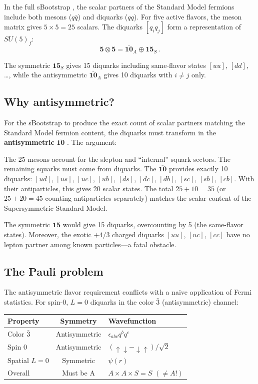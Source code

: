 \documentclass[12pt,a4paper]{article}
\begin{document}
In the full sBootstrap \cite{Rivero2005}, the scalar partners of 
the Standard Model fermions include both mesons ($q\bar{q}$) and 
diquarks ($qq$). For five active flavors, the meson matrix gives 
$5 \times 5 = 25$ scalars. The diquarks $[q_i q_j]$ form a 
representation of $SU(5)_f$:
\begin{equation}
\mathbf{5} \otimes \mathbf{5} = \overline{\mathbf{10}}_A 
\oplus \mathbf{15}_S\,.
\end{equation}

The symmetric $\mathbf{15}_S$ gives 15 diquarks including 
same-flavor states $[uu]$, $[dd]$, \ldots, while the antisymmetric 
$\overline{\mathbf{10}}_A$ gives 10 diquarks with $i \neq j$ only.

\subsection{Why antisymmetric?}

For the sBootstrap to produce the exact count of scalar partners 
matching the Standard Model fermion content, the diquarks must 
transform in the \textbf{antisymmetric} $\overline{\mathbf{10}}$ 
\cite{Rivero2005}. The argument:

The 25 mesons account for the slepton and ``internal'' squark 
sectors. The remaining squarks must come from diquarks. The 
$\overline{\mathbf{10}}$ provides exactly 10 diquarks: $[ud]$, 
$[us]$, $[uc]$, $[ub]$, $[ds]$, $[dc]$, $[db]$, $[sc]$, $[sb]$, 
$[cb]$. With their antiparticles, this gives 20 scalar states. The 
total $25 + 10 = 35$ (or $25 + 20 = 45$ counting antiparticles 
separately) matches the scalar content of the Supersymmetric 
Standard Model.

The symmetric $\mathbf{15}$ would give 15 diquarks, overcounting 
by 5 (the same-flavor states). Moreover, the exotic $+4/3$ charged 
diquarks $[uu]$, $[uc]$, $[cc]$ have no lepton partner among known 
particles---a fatal obstacle.

\subsection{The Pauli problem}

The antisymmetric flavor requirement conflicts with a naive 
application of Fermi statistics. For spin-0, $L=0$ diquarks in 
the color $\bar{3}$ (antisymmetric) channel:

\begin{center}
\begin{tabular}{lcl}
\toprule
Property & Symmetry & Wavefunction \\
\midrule
Color $\bar{3}$ & Antisymmetric & $\epsilon_{abc} q^b q^c$ \\
Spin 0 & Antisymmetric & $(\uparrow\downarrow - \downarrow\uparrow)/\sqrt{2}$ \\
Spatial $L=0$ & Symmetric & $\psi(r)$ \\
\midrule
Overall & Must be A & $A \times A \times S = S$ \quad$(\neq A!)$ \\
\bottomrule
\end{tabular}
\end{center}
\end{document}

